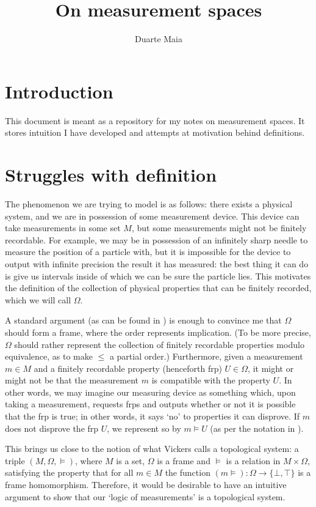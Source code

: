 \documentclass{article}
\title{On measurement spaces}
\author{Duarte Maia}
\theoremstyle{definition}
\theoremstyle{plain}
\begin{document}
\maketitle

\section{Introduction}

This document is meant as a repository for my notes on measurement spaces. It stores intuition I have developed and attempts at motivation behind definitions.

\section{Struggles with definition}

The phenomenon we are trying to model is as follows: there exists a physical system, and we are in possession of some measurement device. This device can take measurements in some set $M$, but some measurements might not be finitely recordable. For example, we may be in possession of an infinitely sharp needle to measure the position of a particle with, but it is impossible for the device to output with infinite precision the result it has measured: the best thing it can do is give us intervals inside of which we can be sure the particle lies. This motivates the definition of the collection of physical properties that can be finitely recorded, which we will call $\Omega$.

A standard argument (as can be found in \cite{topologyvialogic}) is enough to convince me that $\Omega$ should form a frame, where the order represents implication. (To be more precise, $\Omega$ should rather represent the collection of finitely recordable properties modulo equivalence, as to make $\leq$ a partial order.) Furthermore, given a measurement $m \in M$ and a finitely recordable property (henceforth frp) $U \in \Omega$, it might or might not be that the measurement $m$ is compatible with the property $U$. In other words, we may imagine our measuring device as something which, upon taking a measurement, requests frps and outputs whether or not it is possible that the frp is true; in other words, it says `no' to properties it can disprove. If $m$ does not disprove the frp $U$, we represent so by $m \vDash U$ (as per the notation in \cite{topologyvialogic}).

This brings us close to the notion of what Vickers calls a topological system: a triple $(M, \Omega, \vDash)$, where $M$ is a set, $\Omega$ is a frame and $\vDash$ is a relation in $M \times \Omega$, satisfying the property that for all $m \in M$ the function $(m\vDash) \colon \Omega \to \{\bot, \top\}$ is a frame homomorphism. Therefore, it would be desirable to have an intuitive argument to show that our `logic of measurements' is a topological system.
\end{document}
